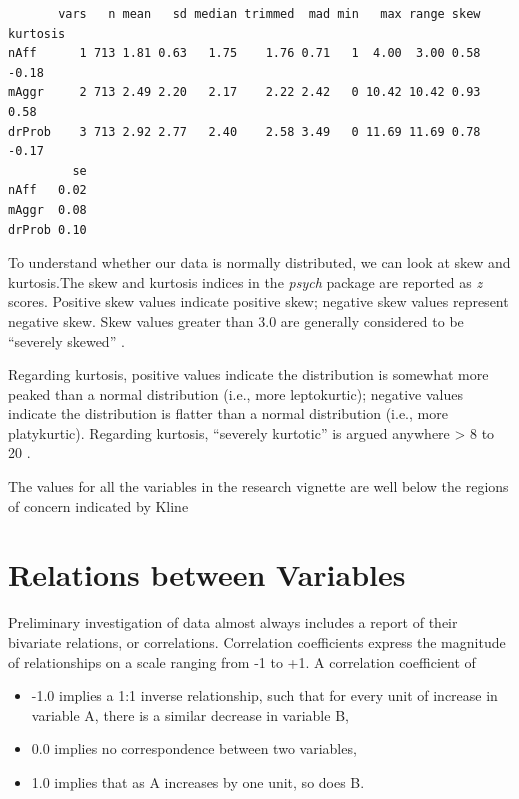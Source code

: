 \documentclass[
  11pt,
]{book}
\providecommand{\tightlist}{%
  \setlength{\itemsep}{0pt}\setlength{\parskip}{0pt}}
\begin{document}
\begin{verbatim}
       vars   n mean   sd median trimmed  mad min   max range skew kurtosis
nAff      1 713 1.81 0.63   1.75    1.76 0.71   1  4.00  3.00 0.58    -0.18
mAggr     2 713 2.49 2.20   2.17    2.22 2.42   0 10.42 10.42 0.93     0.58
drProb    3 713 2.92 2.77   2.40    2.58 3.49   0 11.69 11.69 0.78    -0.17
         se
nAff   0.02
mAggr  0.08
drProb 0.10
\end{verbatim}

To understand whether our data is normally distributed, we can look at skew and kurtosis.The skew and kurtosis indices in the \emph{psych} package are reported as \emph{z} scores. Positive skew values indicate positive skew; negative skew values represent negative skew. Skew values greater than 3.0 are generally considered to be ``severely skewed'' \citep{kline_principles_2016}.

Regarding kurtosis, positive values indicate the distribution is somewhat more peaked than a normal distribution (i.e., more leptokurtic); negative values indicate the distribution is flatter than a normal distribution (i.e., more platykurtic). Regarding kurtosis, ``severely kurtotic'' is argued anywhere \textgreater{} 8 to 20 \citep{kline_principles_2016}.

The values for all the variables in the research vignette are well below the regions of concern indicated by Kline \citeyearpar{kline_principles_2016}

\hypertarget{relations-between-variables}{%
\section{Relations between Variables}\label{relations-between-variables}}

Preliminary investigation of data almost always includes a report of their bivariate relations, or correlations. Correlation coefficients express the magnitude of relationships on a scale ranging from -1 to +1. A correlation coefficient of

\begin{itemize}
\tightlist
\item
  -1.0 implies a 1:1 inverse relationship, such that for every unit of increase in variable A, there is a similar decrease in variable B,
\item
  0.0 implies no correspondence between two variables,
\item
  1.0 implies that as A increases by one unit, so does B.
\end{itemize}
\end{document}
